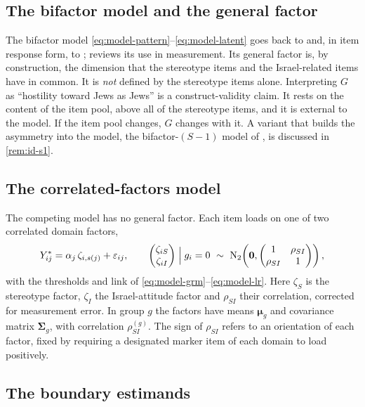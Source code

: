 \subsection{The bifactor model and the general factor}\label{sec:model-bifactor}

The bifactor model \eqref{eq:model-pattern}--\eqref{eq:model-latent} goes back to \citet{schmid1957} and, in item response form, to \citet{gibbons1992}; \citet{reise2012} reviews its use in measurement. Its general factor is, by construction, the dimension that the stereotype items and the Israel-related items have in common. It is \emph{not} defined by the stereotype items alone. Interpreting $G$ as ``hostility toward Jews as Jews'' is a construct-validity claim. It rests on the content of the item pool, above all of the stereotype items, and it is external to the model. If the item pool changes, $G$ changes with it. A variant that builds the asymmetry into the model, the bifactor-$(S-1)$ model of \citet{eid2017}, is discussed in \cref{rem:id-s1}.

\subsection{The correlated-factors model}\label{sec:model-cf}

The competing model has no general factor. Each item loads on one of two correlated domain factors,
\begin{equation}\label{eq:model-cf}
  Y^*_{ij}=\alpha_j\,\zeta_{i,s(j)}+\varepsilon_{ij},\qquad
  \begin{pmatrix}\zeta_{iS}\\ \zeta_{iI}\end{pmatrix}\Bigm| g_i=0\ \sim\ \mathrm N_2\!\left(\bm0,\begin{pmatrix}1&\rho_{SI}\\ \rho_{SI}&1\end{pmatrix}\right),
\end{equation}
with the thresholds and link of \eqref{eq:model-grm}--\eqref{eq:model-lr}. Here $\zeta_S$ is the stereotype factor, $\zeta_I$ the Israel-attitude factor and $\rho_{SI}$ their correlation, corrected for measurement error. In group $g$ the factors have means $\bm\mu_g$ and covariance matrix $\bm\Sigma_g$, with correlation $\rho^{(g)}_{SI}$. The sign of $\rho_{SI}$ refers to an orientation of each factor, fixed by requiring a designated marker item of each domain to load positively.

\subsection{The boundary estimands}\label{sec:model-boundary}

